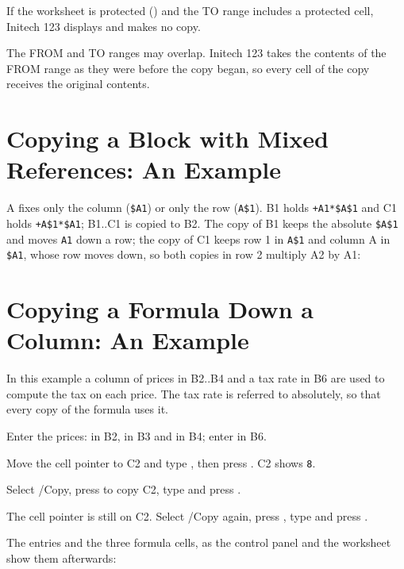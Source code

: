 \begin{Note}
If the worksheet is protected () and the TO range includes a protected cell, Initech 123 displays
 and makes no copy.
\end{Note}

\begin{Note}
The FROM and TO ranges may overlap.  Initech 123 takes the contents of the
FROM range as they were before the copy began, so every cell of the copy
receives the original contents.
\end{Note}

\section{Copying a Block with Mixed References: An Example}
A  fixes only the column (\texttt{\$A1}) or only the
row (\texttt{A\$1}).  B1 holds \texttt{+A1*\$A\$1} and C1 holds
\texttt{+A\$1*\$A1}; B1..C1 is copied to B2.  The copy of B1 keeps the
absolute \texttt{\$A\$1} and moves \texttt{A1} down a row; the copy of C1
keeps row 1 in \texttt{A\$1} and column A in \texttt{\$A1}, whose row
moves down, so both copies in row 2 multiply A2 by A1:


\section{Copying a Formula Down a Column: An Example}
In this example a column of prices in B2..B4 and a tax rate in B6 are used
to compute the tax on each price.  The tax rate is referred to absolutely,
so that every copy of the formula uses it.
\begin{Steps123}
\item Enter the prices:  in B2,  in B3 and  in
  B4; enter  in B6.
\item Move the cell pointer to C2 and type , then press
  .  C2 shows \texttt{8}.
\item Select /Copy, press  to copy C2, type  and press
  .
\item The cell pointer is still on C2.  Select /Copy again, press
  , type  and press .
\end{Steps123}
The entries and the three formula cells, as the control panel and the
worksheet show them afterwards:

